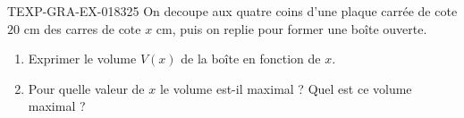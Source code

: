 \begin{exercice}{TEXP-GRA-EX-018}{3}{25}
On decoupe aux quatre coins d'une plaque carrée de cote $20$ cm des carres de cote $x$ cm, puis on replie pour former une boîte ouverte.
\begin{enumerate}
  \item Exprimer le volume $V(x)$ de la boîte en fonction de $x$.
  \item Pour quelle valeur de $x$ le volume est-il maximal ? Quel est ce volume maximal ?
\end{enumerate}

\end{exercice}
